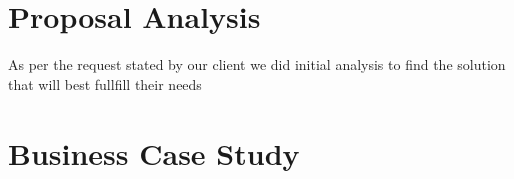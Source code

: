 \section{Proposal Analysis}

As per the request stated by our client we did initial analysis to find the solution that will best fullfill their needs



\section{Business Case Study}
